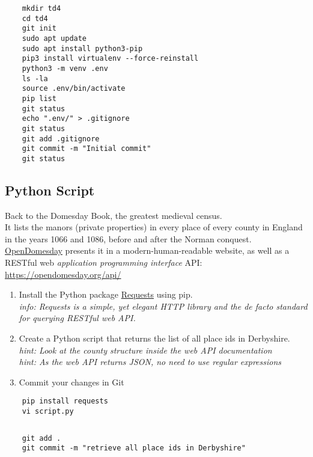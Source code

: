\ifdefined\answer
\begin{verbatim}
    mkdir td4
    cd td4
    git init
    sudo apt update
    sudo apt install python3-pip
    pip3 install virtualenv --force-reinstall
    python3 -m venv .env
    ls -la
    source .env/bin/activate
    pip list
    git status
    echo ".env/" > .gitignore
    git status
    git add .gitignore
    git commit -m "Initial commit"
    git status
\end{verbatim}
\fi

\subsection{Python Script}  %

Back to the Domesday Book, the greatest medieval census. \\
It lists the manors (private properties) in every place of every county in England
in the years 1066 and 1086, before and after the Norman conquest. \\
\href{https://opendomesday.org/}{OpenDomesday} presents it in a
modern-human-readable website,
as well as a RESTful web \textit{application programming interface} API:
\href{https://opendomesday.org/api/}{https://opendomesday.org/api/}

\begin{enumerate}
    \item Install the Python package \href{https://github.com/psf/requests}{Requests}
          using pip. \\
          \textit{info: Requests is a simple, yet elegant HTTP library
          and the de facto standard for querying RESTful web API.}
    \item Create a Python script that returns the list of all place ids in Derbyshire.
          \textit{hint: Look at the county structure inside the web API documentation} \\
          \textit{hint: As the web API returns JSON, no need to use regular expressions}
    \item Commit your changes in Git
\end{enumerate}

\ifdefined\answer
\begin{verbatim}
    pip install requests
    vi script.py
\end{verbatim}
\inputminted[]{python}{TD4_Python_Linux_similarities_answers_python_script.py}
\begin{verbatim}
    git add .
    git commit -m "retrieve all place ids in Derbyshire"
\end{verbatim}
\fi

